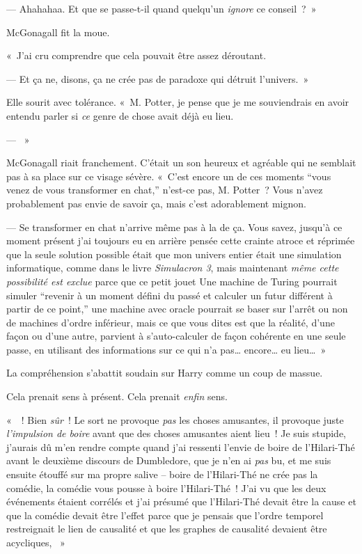 --- Ahahahaa. Et que se passe-t-il quand quelqu'un \emph{ignore} ce conseil~?~»

McGonagall fit la moue.

«~J'ai cru comprendre que cela pouvait être assez déroutant.

--- Et ça ne, disons, ça ne crée pas de paradoxe qui détruit l'univers.~»

Elle sourit avec tolérance.
«~M. Potter, je pense que je me souviendrais en avoir entendu parler si \emph{ce} genre de chose avait déjà eu lieu.

--- ~»

McGonagall riait franchement.
C'était un son heureux et agréable qui ne semblait pas à sa place sur ce visage sévère.
«~C'est encore un de ces moments “vous venez de vous transformer en chat,” n'est-ce pas, M. Potter~?
Vous n'avez probablement pas envie de savoir ça, mais c'est adorablement mignon.

--- Se transformer en chat n'arrive même pas à la  de ça.
Vous savez, jusqu'à ce moment présent j'ai toujours eu en arrière pensée cette crainte atroce et réprimée que la seule solution possible était que mon univers entier était une simulation informatique, comme dans le livre \emph{Simulacron 3}, mais maintenant \emph{même cette possibilité est exclue} parce que ce petit jouet 
Une machine de Turing pourrait simuler “revenir à un moment défini du passé et calculer un futur différent à partir de ce point,” une machine avec oracle pourrait se baser sur l'arrêt ou non de machines d'ordre inférieur, mais ce que vous dites est que la réalité, d'une façon ou d'une autre, parvient à s'auto-calculer de façon cohérente en une seule passe, en utilisant des informations sur ce qui n'a pas… encore… eu lieu…~»

La compréhension s'abattit soudain sur Harry comme un coup de massue.

Cela prenait sens à présent. Cela prenait \emph{enfin} sens.

«~~!
Bien \emph{sûr}~!
Le sort ne provoque \emph{pas} les choses amusantes, il provoque juste \emph{l'impulsion de boire} avant que des choses amusantes aient lieu~!
Je suis stupide, j'aurais dû m'en rendre compte quand j'ai ressenti l'envie de boire de l'Hilari-Thé avant le deuxième discours de Dumbledore, que je n'en ai \emph{pas} bu, et me suis ensuite étouffé sur ma propre salive -- boire de l'Hilari-Thé ne crée pas la comédie, la comédie vous pousse à boire l'Hilari-Thé~!
J'ai vu que les deux événements étaient corrélés et j'ai présumé que l'Hilari-Thé devait être la cause et que la comédie devait être l'effet parce que je pensais que l'ordre temporel restreignait le lien de causalité et que les graphes de causalité devaient être acycliques, ~»


